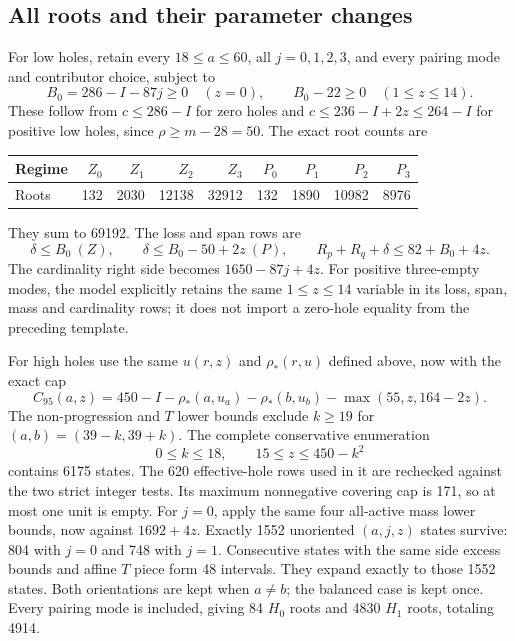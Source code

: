 \documentclass[11pt,a4paper]{article}
\theoremstyle{remark}
\begin{document}
\subsection{All roots and their parameter changes}
For low holes, retain every $18\le a\le60$, all $j=0,1,2,3$, and every
pairing mode and contributor choice, subject to
\[
 B_0=286-I-87j\ge0\quad(z=0),\qquad
 B_0-22\ge0\quad(1\le z\le14).
\]
These follow from $c\le286-I$ for zero holes and
$c\le236-I+2z\le264-I$ for positive low holes, since $\rho\ge m-28=50$.
The exact root counts are
\begin{center}\small
\begin{tabular}{lrrrrrrrr}
\toprule
Regime&$Z_0$&$Z_1$&$Z_2$&$Z_3$&$P_0$&$P_1$&$P_2$&$P_3$\\\midrule
Roots&132&2030&12138&32912&132&1890&10982&8976\\\bottomrule
\end{tabular}
\end{center}
They sum to 69192. The loss and span rows are
\[
 \delta\le B_0\ (Z),\qquad\delta\le B_0-50+2z\ (P),\qquad
 R_p+R_q+\delta\le82+B_0+4z.
\]
The cardinality right side becomes $1650-87j+4z$.
For positive three-empty modes, the model explicitly retains the same
$1\le z\le14$ variable in its loss, span, mass and cardinality rows;
it does not import a zero-hole equality from the preceding template.

For high holes use the same $u(r,z)$ and $\rho_*(r,u)$ defined above,
now with the exact cap
\[
 C_{95}(a,z)=450-I-\rho_*(a,u_a)-\rho_*(b,u_b)
                      -\max(55,z,164-2z).
\]
The non-progression and $T$ lower bounds exclude $k\ge19$ for
$(a,b)=(39-k,39+k)$. The complete conservative enumeration
\[
 0\le k\le18,\qquad15\le z\le450-k^2
\]
contains 6175 states. The 620 effective-hole rows used in it are
rechecked against the two strict integer tests. Its maximum nonnegative
covering cap is 171, so at most one unit is empty. For $j=0$, apply the
same four all-active mass lower bounds, now against $1692+4z$.
Exactly 1552 unoriented $(a,j,z)$ states survive: 804 with $j=0$ and
748 with $j=1$. Consecutive states with the same side excess bounds
and affine $T$ piece form 48 intervals. They expand exactly to those
1552 states. Both orientations are kept when $a\ne b$; the balanced
case is kept once. Every pairing mode is included, giving 84 $H_0$
roots and 4830 $H_1$ roots, totaling 4914.
\end{document}
